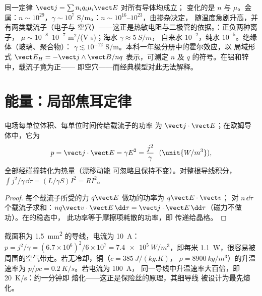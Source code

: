 \begin{remark}\label{rem:b2:charges-currents-conduction:materials}
同一定律 $\vect j = \sum n_iq_i\mu_i\vect E$ 对所有导体均成立；
变化的是 $n$ 与 $\mu$。金属：$n \sim 10^{29}$，$\gamma \sim 10^7$
S/m。：$n \sim 10^{16}$--$10^{23}$，由掺杂决定，
随温度急剧升高，并有两类载流子（电子与
空穴）——这正是热敏电阻与二极管的依据。：正负两种离子，
$\mu \sim 10^{-8}$--$10^{-7}$ m$^2$/(V s)；海水 $\gamma \approx \qty{5}{S/m}$，
自来水 $10^{-2}$，纯水 $10^{-5}$。绝缘体（玻璃、聚合物）：
$\gamma \lesssim 10^{-12}$ S/m。本科一年级分册中的霍尔效应，以
局域形式 $\vect E_H = -\vect j\wedge\vect B/nq$ 表示，可测定 $n$ 及
$q$ 的符号。在铝和锌中，载流子竟为正——
即空穴——而经典模型对此无法解释。
\end{remark}

\section{能量：局部焦耳定律}

\begin{proposition}[局部焦耳定律]\label{prop:b2:charges-currents-conduction:joule}
电场每单位体积、每单位时间传给载流子的功率
为 $\vect j\cdot\vect E$；在欧姆导体中，它为
\[
p = \vect j\cdot\vect E = \gamma E^2 = \frac{j^2}\gamma \ \ (\unit{W/m^3}) ,
\]
全部经碰撞转化为热量（漂移动能
可忽略且保持不变）。对整根导线积分，$\int j^2/\gamma\,\dd\tau
= (L/\gamma S)I^2 = RI^2$。
\end{proposition}

\begin{proof}
每个载流子所受的力 $q\vect E$ 做功的功率为 $q\vect E\cdot\vect v$；
对 $n\,\dd\tau$ 个载流子求和：$nq\vect v\cdot\vect E\,\dd\tau = \vect j\cdot
\vect E\,\dd\tau$（磁力不做功）。在的稳态中，
此功率等于摩擦项耗散的功率，即
传递给晶格。
\end{proof}

\begin{example}[导线发热]\label{ex:b2:charges-currents-conduction:heating}
截面积为 \qty{1.5}{mm^2} 的导线，电流为 \qty{10}{A}：$p = j^2/\gamma = (6.7 \times 10^6)^2/6 \times 10^7 =
\qty{7.4e5}{W/m^3}$，即每米 \qty{1.1}{W}，很容易被
周围的空气带走。若无冷却，铜（$c = \qty{385}{J/(kg.K)}$，
$\rho = \qty{8900}{kg/m^3}$）的升温速率为 $p/\rho c = \qty{0.2}{K/s}$。若电流为 \qty{100}{A}，
同一导线中升温速率大百倍，即 \qty{20}{K/s}：约一分钟即
熔化——这正是保险丝的原理，其细导线
被设计为最先熔化。
\end{example}

